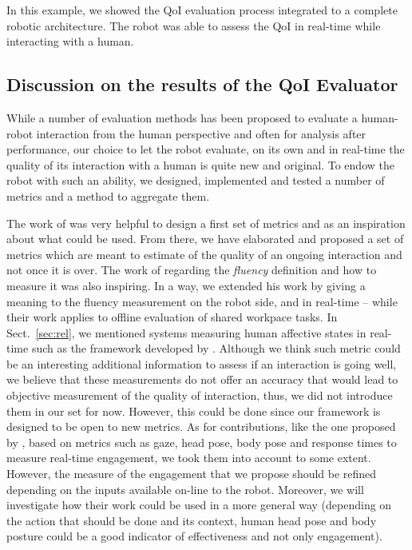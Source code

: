 \documentclass[a4paper,11pt,twoside]{StyleThese}
\begin{document}
In this example, we showed the QoI evaluation process integrated to a complete robotic architecture. The robot was able to assess the QoI in real-time while interacting with a human.

\subsection{Discussion on the results of the QoI Evaluator}
While a number of evaluation methods has been proposed to evaluate a human-robot interaction from the human perspective and often for analysis after performance, our choice to let the robot evaluate, on its own and in real-time the quality of its interaction with a human is quite new and original. To endow the robot with such an ability, we designed, implemented and tested a number of metrics and a method to aggregate them.

The work of \cite{steinfeld_2006_common} was very helpful to design a first set of metrics and as an inspiration about what could be used. From there, we have elaborated and proposed a set of metrics which are meant to estimate of the quality of an ongoing interaction and not once it is over. 
The work of \cite{hoffman2019} regarding the \emph{fluency} definition and how to measure it was also inspiring. In a way, we extended his work by giving a meaning to the fluency measurement on the robot side, and in real-time -- while their work applies to offline evaluation of shared workpace tasks. 
In Sect.~\ref{sec:rel}, we mentioned systems measuring human affective states in real-time such as the framework developed by \cite{tanevska:hal-01615491}. Although we think such metric could be an interesting additional information to assess if an interaction is going well, we believe that these measurements do not offer an accuracy that would lead to objective measurement of the quality of interaction, thus, we did not introduce them in our set for now. However, this could be done since our framework is designed to be open to new metrics. 
As for contributions, like the one proposed by \cite{anzalone_2015_evaluating}, based on metrics such as gaze, head pose, body pose and response times to measure real-time engagement, we took them into account to some extent. However, the measure of the engagement that we propose should be refined depending on the inputs available on-line to the robot. Moreover, we will investigate how their work could be used in a more general way (\eg depending on the action that should be done and its context, human head pose and body posture could be a good indicator of effectiveness and not only engagement). 
\end{document}
